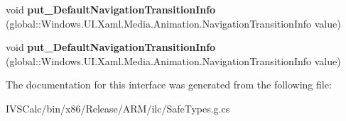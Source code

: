 \begin{DoxyCompactItemize}
void {\bfseries put\+\_\+\+Default\+Navigation\+Transition\+Info} (global\+::\+Windows.\+U\+I.\+Xaml.\+Media.\+Animation.\+Navigation\+Transition\+Info value)
\item 
\mbox{\label{interface_windows_1_1_u_i_1_1_xaml_1_1_media_1_1_animation_1_1_i_navigation_theme_transition_ab149a0c0f7869628f2cf0732d48da116}} 
void {\bfseries put\+\_\+\+Default\+Navigation\+Transition\+Info} (global\+::\+Windows.\+U\+I.\+Xaml.\+Media.\+Animation.\+Navigation\+Transition\+Info value)
\end{DoxyCompactItemize}


The documentation for this interface was generated from the following file\+:\begin{DoxyCompactItemize}
\item 
I\+V\+S\+Calc/bin/x86/\+Release/\+A\+R\+M/ilc/Safe\+Types.\+g.\+cs\end{DoxyCompactItemize}
